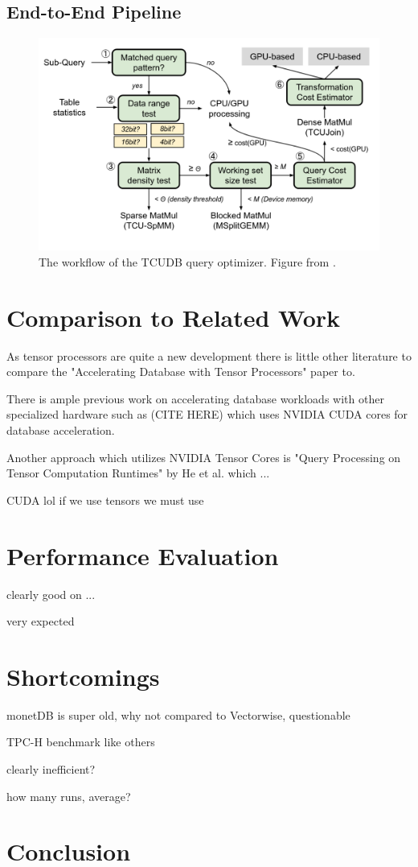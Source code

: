\documentclass{paper}
\begin{document}
	\subsection{End-to-End Pipeline}
	

	\begin{figure}
		\centering
		\includegraphics[width=1\linewidth]{pipeline}
		\caption{The workflow of the TCUDB query optimizer. Figure from \cite{hu2021tcudb}.}
		\label{fig:pipeline}
	\end{figure}
	
	
	\section{Comparison to Related Work}
	As tensor processors are quite a new development there is little other literature to compare the "Accelerating Database with Tensor Processors" paper to. 
	
	There is ample previous work on accelerating database workloads with other specialized hardware such as (CITE HERE) which uses NVIDIA CUDA cores for database acceleration.
	
	Another approach which utilizes NVIDIA Tensor Cores is "Query Processing on Tensor Computation Runtimes" by He et al. which ...
	
	CUDA 
	\cite{he2022query}lol \cite{hu2021tcudb}
	  \cite{sun_2022}
	if we use tensors we must use 
	
	\section{Performance Evaluation}
	
	clearly good on ...
	
	very expected
	
	\section{Shortcomings}
	
	monetDB is super old, why not compared to Vectorwise, questionable 
	
	TPC-H benchmark like others
	
	clearly inefficient? 
	
	how many runs, average?
	
	
	\section{Conclusion}
	


	
\end{document}
